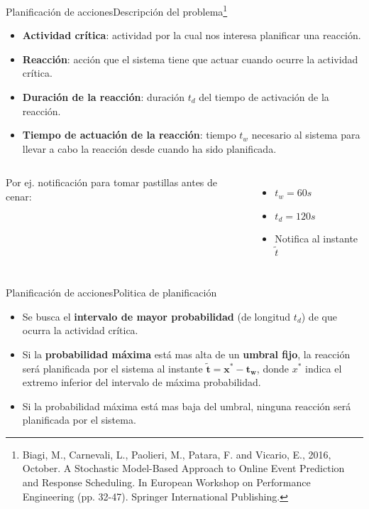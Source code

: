 \documentclass[9pt, handout]{beamer}
\begin{document}
      \begin{frame}{Planificación de acciones}{Descripción del problema\footnote{Biagi, M., Carnevali, L., Paolieri, M., Patara, F. and Vicario, E., 2016, October. A Stochastic Model-Based Approach to Online Event Prediction and Response Scheduling. In European Workshop on Performance Engineering (pp. 32-47). Springer International Publishing.}}
        \pause
        \begin{itemize}
          \item \textbf{Actividad crítica}: actividad por la cual nos interesa planificar una reacción.
          \pause
          \item \textbf{Reacción}: acción que el sistema tiene que actuar cuando ocurre la actividad crítica.
          \pause
          \item \textbf{Duración de la reacción}: duración $t_d$ del tiempo de activación de la reacción.
          \pause
          \item \textbf{Tiempo de actuación de la reacción}: tiempo $t_w$ necesario al sistema para llevar a cabo la reacción desde cuando ha sido planificada.
        \end{itemize}
        
        \pause
       	\begin{columns}
       		\centering
       		
       		Por ej. notificación para tomar pastillas antes de cenar:
       		\begin{itemize}
       			\item $t_w = 60s$
       			\item $t_d = 120s$
       			\item Notifica al instante $\tilde t$
       		\end{itemize}
       	\end{columns}
      \end{frame}
      
      \begin{frame}{Planificación de acciones}{Politica de planificación}
        \pause
        \begin{itemize}
          \item Se busca el \textbf{intervalo de mayor probabilidad} (de longitud $t_d$) de que ocurra la actividad crítica.
          \pause
          \item Si la \textbf{probabilidad máxima} está mas alta de un \textbf{umbral fijo}, la reacción será planificada por el sistema al instante $\boldsymbol{\tilde t = x^* - t_w}$, donde $x^*$ indica el extremo inferior del intervalo de máxima probabilidad.
          \pause
          \item Si la probabilidad máxima está mas baja del umbral, ninguna reacción será planificada por el sistema.
        \end{itemize}
        
        \pause
        \vspace{-1em}
        \centering
        
      \end{frame}
      
\end{document}
